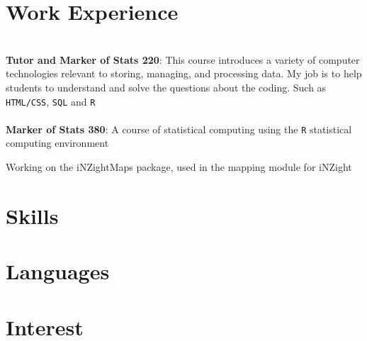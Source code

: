 \documentclass[11pt,a4paper,sans]{moderncv} %
\begin{document}
\newpage
\section{Work Experience}
  {}{}{}{
	~\\
	\textbf{Tutor and Marker of Stats 220}: This course introduces a variety of computer technologies relevant to storing, managing, and processing data. My job is to help students to understand and solve the questions about the coding. Such as \texttt{HTML/CSS}, \texttt{SQL} and \texttt{R} \\~\\
	\textbf{Marker of Stats 380}: A course of statistical computing using the \texttt{R} statistical computing environment\\}

  {}{Working on the iNZightMaps package, used in the mapping module for iNZight}{}{}



\section{Skills}




\section{Languages}

\section{Interest}
\end{document}
